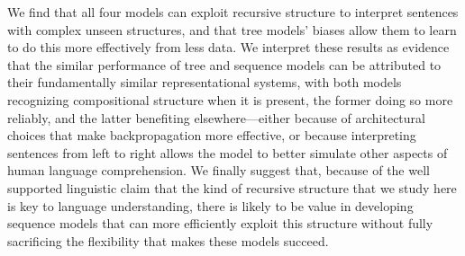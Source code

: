 We find that all four models can exploit recursive structure to interpret sentences with complex unseen structures, and that tree models' biases allow them to learn to do this more effectively from less data. 
We interpret these results as evidence that the similar performance of tree and sequence models can be attributed to their fundamentally similar representational systems, with both models recognizing compositional structure when it is present, the former doing so more reliably, and the latter benefiting elsewhere---either because of architectural choices that make backpropagation more effective, or because interpreting sentences from left to right allows the model to better simulate other aspects of human language comprehension. We finally suggest that, because of the well supported linguistic claim that the kind of recursive structure that we study here is key to language understanding, there is likely to be value in developing sequence models that can more efficiently exploit this structure without fully sacrificing the flexibility that makes these models succeed.
